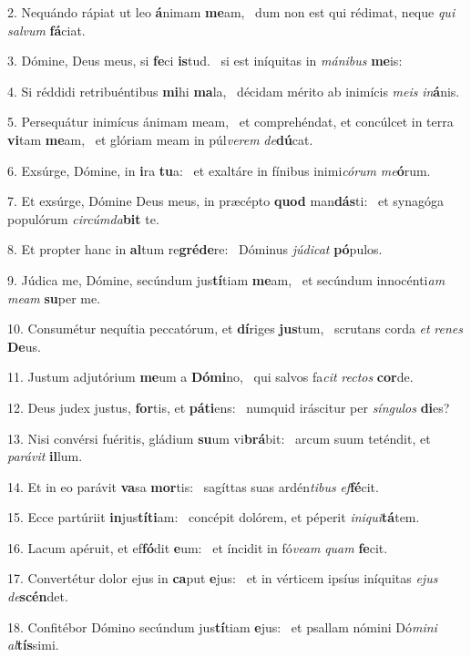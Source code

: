 2. Nequándo rápiat ut leo \textbf{á}nimam \textbf{me}am, \ast\  dum non est qui rédimat, neque \textit{qui} \textit{sal}\textit{vum} \textbf{fá}ciat.\

3. Dómine, Deus meus, si \textbf{fe}ci \textbf{is}tud. \ast\  si est iníquitas in \textit{má}\textit{ni}\textit{bus} \textbf{me}is:\

4. Si réddidi retribuéntibus \textbf{mi}hi \textbf{ma}la, \ast\  décidam mérito ab inimícis \textit{me}\textit{is} \textit{in}\textbf{á}nis.\

5. Persequátur inimícus ánimam meam, \dag\  et comprehéndat, et concúlcet in terra \textbf{vi}tam \textbf{me}am, \ast\  et glóriam meam in púl\textit{ve}\textit{rem} \textit{de}\textbf{dú}cat.\

6. Exsúrge, Dómine, in \textbf{i}ra \textbf{tu}a: \ast\  et exaltáre in fínibus inimi\textit{có}\textit{rum} \textit{me}\textbf{ó}rum.\

7. Et exsúrge, Dómine Deus meus, in præcépto \textbf{quod} man\textbf{dás}ti: \ast\  et synagóga populórum \textit{cir}\textit{cúm}\textit{da}\textbf{bit} te.\

8. Et propter hanc in \textbf{al}tum re\textbf{gré}\textbf{de}re: \ast\  Dóminus \textit{jú}\textit{di}\textit{cat} \textbf{pó}pulos.\

9. Júdica me, Dómine, secúndum jus\textbf{tí}tiam \textbf{me}am, \ast\  et secúndum innocénti\textit{am} \textit{me}\textit{am} \textbf{su}per me.\

10. Consumétur nequítia peccatórum, et \textbf{dí}riges \textbf{jus}tum, \ast\  scrutans corda \textit{et} \textit{re}\textit{nes} \textbf{De}us.\

11. Justum adjutórium \textbf{me}um a \textbf{Dó}\textbf{mi}no, \ast\  qui salvos fa\textit{cit} \textit{rec}\textit{tos} \textbf{cor}de.\

12. Deus judex justus, \textbf{for}tis, et \textbf{pá}\textbf{ti}ens: \ast\  numquid iráscitur per \textit{sín}\textit{gu}\textit{los} \textbf{di}es?\

13. Nisi convérsi fuéritis, gládium \textbf{su}um vi\textbf{brá}bit: \ast\  arcum suum teténdit, et \textit{pa}\textit{rá}\textit{vit} \textbf{il}lum.\

14. Et in eo parávit \textbf{va}sa \textbf{mor}tis: \ast\  sagíttas suas ardén\textit{ti}\textit{bus} \textit{ef}\textbf{fé}cit.\

15. Ecce partúriit \textbf{in}jus\textbf{tí}\textbf{ti}am: \ast\  concépit dolórem, et péperit \textit{in}\textit{i}\textit{qui}\textbf{tá}tem.\

16. Lacum apéruit, et ef\textbf{fó}dit \textbf{e}um: \ast\  et íncidit in fó\textit{ve}\textit{am} \textit{quam} \textbf{fe}cit.\

17. Convertétur dolor ejus in \textbf{ca}put \textbf{e}jus: \ast\  et in vérticem ipsíus iníquitas \textit{e}\textit{jus} \textit{de}\textbf{scén}det.\

18. Confitébor Dómino secúndum jus\textbf{tí}tiam \textbf{e}jus: \ast\  et psallam nómini Dó\textit{mi}\textit{ni} \textit{al}\textbf{tís}simi.\

